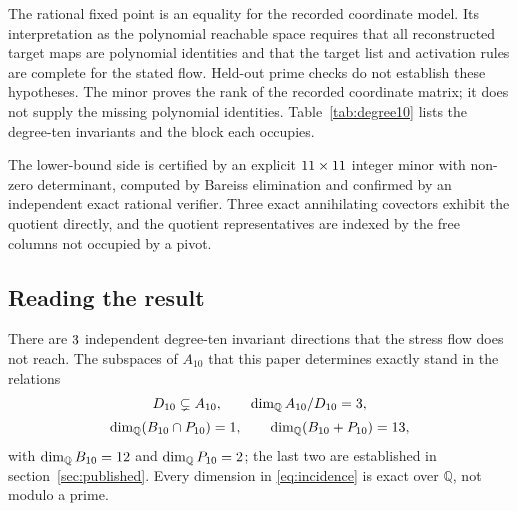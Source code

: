 \documentclass[11pt,a4paper]{article}
\theoremstyle{definition}
\theoremstyle{remark}
\newcommand{\Ften}{A_{10}}
\newcommand{\Dten}{D_{10}}
\newcommand{\Bten}{B_{10}}
\newcommand{\Pten}{P_{10}}
\newcommand{\Q}{\mathbb{Q}}
\begin{document}
The rational fixed point is an equality for the recorded coordinate model.
Its interpretation as the polynomial reachable space requires that all
reconstructed target maps are polynomial identities and that the target list
and activation rules are complete for the stated flow. Held-out prime checks
do not establish these hypotheses. The minor proves the rank of the recorded
coordinate matrix; it does not supply the missing polynomial identities. Table~\ref{tab:degree10} lists the
degree-ten invariants and the block each occupies.



The lower-bound side is certified by an explicit $11 \times
11$ integer minor with non-zero determinant, computed by Bareiss
elimination and confirmed by an independent exact rational verifier. Three exact
annihilating covectors exhibit the quotient directly, and the quotient
representatives are indexed by the free columns not occupied by a pivot.



\subsection{Reading the result}
There are $3$ independent degree-ten invariant directions that the stress
flow does not reach. The subspaces of $\Ften$ that this paper determines exactly stand in the
relations
\begin{equation}
\begin{gathered}
\Dten \subsetneq \Ften,
\qquad
\dim_\Q \Ften/\Dten = \dimQtenQ,
\\[2pt]
\dim_\Q(\Bten \cap \Pten) = \dimBcapP,
\qquad
\dim_\Q(\Bten + \Pten) = \dimBplusP,
\end{gathered}
\label{eq:incidence}
\end{equation}
with $\dim_\Q \Bten = \dimBten$ and $\dim_\Q \Pten = \dimPten$; the last two
are established in section~\ref{sec:published}. Every dimension in
\eqref{eq:incidence} is exact over $\Q$, not modulo a prime.
\end{document}
